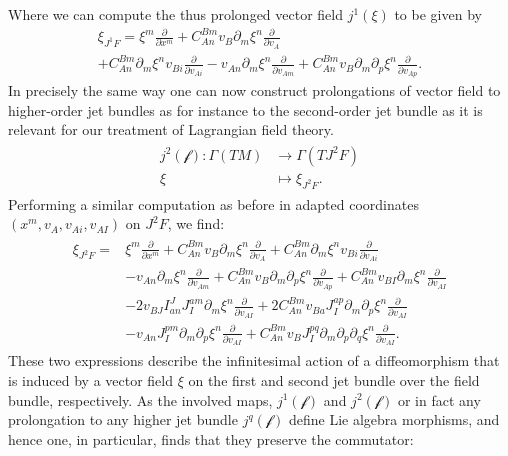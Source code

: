 \documentclass[a4paper,12pt, DIV=14, BCOR=5mm, twoside, headsepline, numbers=noenddot]{scrbook}
\begin{document}
Where we can compute the thus prolonged vector field $j^1(\xi)$ to be given by 
\begin{multline}\label{LieJ1}
    \xi_{J^1F} = \xi^m \frac{\partial}{\partial x^m} + C_{An}^{Bm} v_B \partial_m \xi ^n \frac{\partial}{\partial v_A}\\
    + C_{An}^{Bm} \partial_m \xi^n v_{Bi} \frac{\partial}{\partial v_{Ai}} - v_{An} \partial_m \xi ^n \frac{\partial}{\partial v_{Am}} + C_{An}^{Bm} v_B \partial_m \partial_p \xi^n \frac{\partial}{\partial v_{Ap}}.
\end{multline}
In precisely the same way one can now construct prolongations of vector field to higher-order jet bundles as for instance to the second-order jet bundle as it is relevant for our treatment of Lagrangian field theory.
\begin{align}
    \begin{aligned}
    j^2(\mathcal{f}) : \Gamma(TM) &\longrightarrow \Gamma(TJ^2F)\\
    \xi & \longmapsto \xi_{J^2F}.
    \end{aligned}
\end{align}
Performing a similar computation as before in adapted coordinates $(x^m,v_A,v_{Ai}, v_{AI})$ on $J^2F$, we find:
\begin{align}\label{LieJ2}
\begin{aligned}
    \xi_{J^2F} = &\xi^m \frac{\partial}{\partial x^m} + C_{An}^{Bm} v_B \partial_m \xi ^n \frac{\partial}{\partial v_A}
    + C_{An}^{Bm} \partial_m \xi^n v_{Bi} \frac{\partial}{\partial v_{Ai}}\\
    &- v_{An} \partial_m \xi ^n \frac{\partial}{\partial v_{Am}} + C_{An}^{Bm} v_B \partial_m \partial_p \xi^n \frac{\partial}{\partial v_{Ap}} 
    + C_{An}^{Bm} v_{BI} \partial_m \xi ^n \frac{\partial}{\partial v_{AI}}\\
    &- 2 v_{BJ} I^J_{an}J^{am}_I \partial_m \xi^n \frac{\partial}{\partial v_{AI}} + 2 C_{An}^{Bm} v_{Ba}J^{ap}_I \partial_m \partial_p \xi^n \frac{\partial}{\partial v_{AI}}\\
    &- v_{An} J^{pm}_I \partial_m \partial_p \xi^n\frac{\partial}{\partial v_{AI}} + C_{An}^{Bm} v_B J^{pq}_I \partial_m \partial_p \partial_q \xi^n \frac{\partial}{\partial v_{AI}}.
\end{aligned}
\end{align}
These two expressions describe the infinitesimal action of a diffeomorphism that is induced by a vector field $\xi$ on the first and second jet bundle over the field bundle, respectively. 
As the involved maps, $j^1(\mathcal{f})$ and $j^2(\mathcal{f})$ or in fact any prolongation to any higher jet bundle $j^q(\mathcal{f})$ define Lie algebra morphisms, and hence one, in particular, finds that they preserve the commutator:
\end{document}

